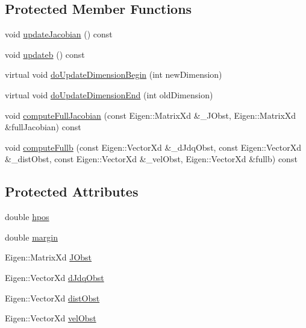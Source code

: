 \subsection*{Protected Member Functions}
\begin{DoxyCompactItemize}
\item 
void \hyperlink{classocra_1_1ContactAvoidanceFunction_aca72dc43ecd3d95bb917139ac6ae19c1}{update\+Jacobian} () const
\item 
void \hyperlink{classocra_1_1ContactAvoidanceFunction_aed2f145f17ff9fd8dd646018376ea7e9}{updateb} () const
\item 
virtual void \hyperlink{classocra_1_1ContactAvoidanceFunction_a4f33ca5589b08a96207be800b9f4bd57}{do\+Update\+Dimension\+Begin} (int new\+Dimension)
\item 
virtual void \hyperlink{classocra_1_1ContactAvoidanceFunction_ad81a7b03b0fb7e8b2a037bccf5faea84}{do\+Update\+Dimension\+End} (int old\+Dimension)
\item 
void \hyperlink{classocra_1_1ContactAvoidanceFunction_a59994d2c3f364575ecff7fb23b7e10ab}{compute\+Full\+Jacobian} (const Eigen\+::\+Matrix\+Xd \&\+\_\+\+J\+Obst, Eigen\+::\+Matrix\+Xd \&full\+Jacobian) const
\item 
void \hyperlink{classocra_1_1ContactAvoidanceFunction_a9afd02871f0d26321b526290f565d541}{compute\+Fullb} (const Eigen\+::\+Vector\+Xd \&\+\_\+d\+Jdq\+Obst, const Eigen\+::\+Vector\+Xd \&\+\_\+dist\+Obst, const Eigen\+::\+Vector\+Xd \&\+\_\+vel\+Obst, Eigen\+::\+Vector\+Xd \&fullb) const
\end{DoxyCompactItemize}
\subsection*{Protected Attributes}
\begin{DoxyCompactItemize}
\item 
double \hyperlink{classocra_1_1ContactAvoidanceFunction_a49e94dae2d7708e66cf11e737b1a4d6d}{hpos}
\item 
double \hyperlink{classocra_1_1ContactAvoidanceFunction_a5a4c2e4dae17aef6c4cf6fa1b3be093e}{margin}
\item 
Eigen\+::\+Matrix\+Xd \hyperlink{classocra_1_1ContactAvoidanceFunction_a233c509632182b45540a30b818254713}{J\+Obst}
\item 
Eigen\+::\+Vector\+Xd \hyperlink{classocra_1_1ContactAvoidanceFunction_a59c655299c8db310d3e06a47729f0780}{d\+Jdq\+Obst}
\item 
Eigen\+::\+Vector\+Xd \hyperlink{classocra_1_1ContactAvoidanceFunction_aa3d1b5f23d42c0936b1fa09ad7988732}{dist\+Obst}
\item 
Eigen\+::\+Vector\+Xd \hyperlink{classocra_1_1ContactAvoidanceFunction_a19eb96ace3a217e5ea1c80dec97eeeb2}{vel\+Obst}
\end{DoxyCompactItemize}
